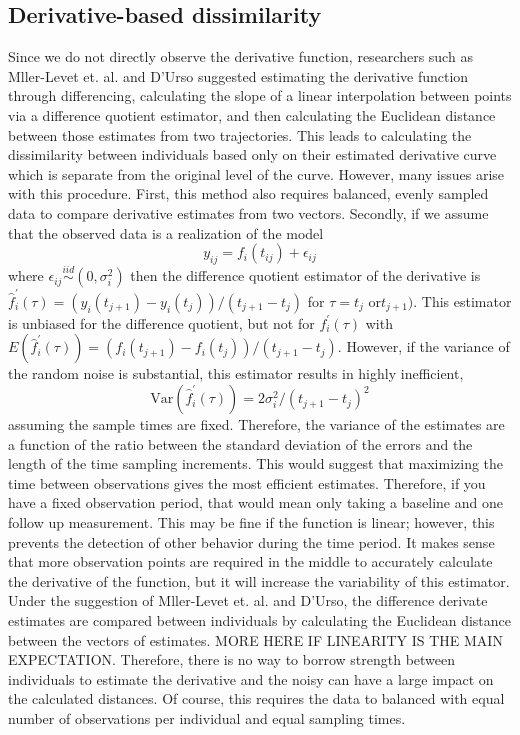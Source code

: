 \documentclass[12pt]{article}
\begin{document}
\subsection{Derivative-based dissimilarity}
 Since we do not directly observe the derivative function, researchers such as Mller-Levet et. al. \cite{moller2003} and D'Urso \cite{d2000} suggested estimating the derivative function through differencing, calculating the slope of a linear interpolation between points via a difference quotient estimator, and then calculating the Euclidean distance between those estimates from two trajectories. This leads to calculating the dissimilarity between individuals based only on their estimated derivative curve which is separate from the original level of the curve. However, many issues arise with this procedure. First, this method also requires balanced, evenly sampled data to compare derivative estimates from two vectors. Secondly, if we assume that the observed data is a realization of the model
$$y_{ij}= f_i(t_{ij})+\epsilon_{ij}$$
where $\epsilon_{ij}\overset{iid}{\sim} (0,\sigma_{i}^{2})$ then the difference quotient estimator of the derivative is $\hat{f}_{i}^{'}(\tau) = (y_i(t_{j+1})-y_i(t_j))/(t_{j+1}-t_j)$ for $\tau= t_{j}$ or$ t_{j+1})$. This estimator is unbiased for the difference quotient, but not for $f_{i}^{'}(\tau)$ with $E(\hat{f}_{i}^{'}(\tau)) = (f_i(t_{j+1})-f_i(t_j))/(t_{j+1}-t_j)$. However, if the variance of the random noise is substantial, this estimator results in highly inefficient,
$$\text{Var}(\hat{f}_{i}^{'}(\tau)) =  2\sigma^{2}_{i}/ (t_{j+1}-t_j)^{2}$$
assuming the sample times are fixed. Therefore, the variance of the estimates are a function of the ratio between the standard deviation of the errors and the length of the time sampling increments. This would suggest that maximizing the time between observations gives the most efficient estimates. Therefore, if you have a fixed observation period, that would mean only taking a baseline and one follow up measurement. This may be fine if the function is linear; however, this prevents the detection of other behavior during the time period. It makes sense that more observation points are required in the middle to accurately calculate the derivative of the function, but it will increase the variability of this estimator. Under the suggestion of Mller-Levet et. al. and D'Urso, the difference derivate estimates are compared between individuals by calculating the Euclidean distance between the vectors of estimates. MORE HERE IF LINEARITY IS THE MAIN EXPECTATION. Therefore, there is no way to borrow strength between individuals to estimate the derivative and the noisy can have a large impact on the calculated distances. Of course, this requires the data to balanced with equal number of observations per individual and equal sampling times. \\\\ 
\end{document}

